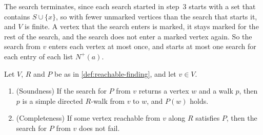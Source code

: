 The search terminates, since each search started in step~3 starts
with a set that contains $S \cup \{x\}$, so with fewer unmarked
vertices than the search that starts it, and $V$ is finite. A vertex
that the search enters is marked, it stays marked for the rest of the
search, and the search does not enter a marked vertex again. So the
search from $v$ enters each vertex at most once, and starts at most one
search for each entry of each list $N^+(a)$.

\begin{theorem}
  \label{thm:reachable-finding-correct}
  \leanok
  Let $V$, $R$ and $P$ be as in \cref{def:reachable-finding}, and let
  $v \in V$.
  \begin{enumerate}
    \item (Soundness) If the search for $P$ from $v$ returns a vertex
      $w$ and a walk $p$, then $p$ is a simple directed $R$-walk from
      $v$ to $w$, and $P(w)$ holds.
    \item (Completeness) If some vertex reachable from $v$ along $R$
      satisfies $P$, then the search for $P$ from $v$ does not fail.
  \end{enumerate}
\end{theorem}
